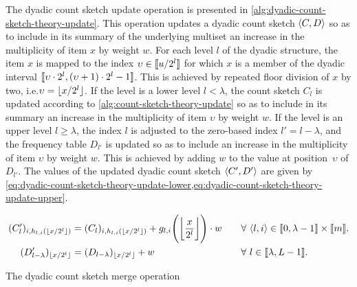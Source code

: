 The dyadic count sketch update operation is presented in \cref{alg:dyadic-count-sketch-theory-update}.
This operation updates a dyadic count sketch \( \langle C, D\rangle \) so as to include in its summary of the underlying multiset an increase in the multiplicity of item \( x \) by weight \( w \).
For each level \( l \) of the dyadic structure, the item \( x \) is mapped to the index \( \upsilon \in \llbracket u / 2^{l}\rrbracket \) for which \( x \) is a member of the dyadic interval \( \llbracket\upsilon \cdot 2^{l}, (\upsilon + 1) \cdot 2^{l} - 1\rrbracket \).
This is achieved by repeated floor division of \( x \) by two, i.e.\@ \( \upsilon = \lfloor x / 2^{l}\rfloor \).
If the level is a lower level \( l < \lambda \), the count sketch \( C_{l} \) is updated according to \cref{alg:count-sketch-theory-update} so as to include in its summary an increase in the multiplicity of item \( \upsilon \) by weight \( w \).
If the level is an upper level \( l \geq \lambda \), the index \( l \) is adjusted to the zero-based index \( l' = l - \lambda \), and the frequency table \( D_{l'} \) is updated so as to include an increase in the multiplicity of item \( \upsilon \) by weight \( w \).
This is achieved by adding \( w \) to the value at position~\( \upsilon \) of \( D_{l'} \).
The values of the updated dyadic count sketch \( \langle C', D'\rangle \) are given by \cref{eq:dyadic-count-sketch-theory-update-lower,eq:dyadic-count-sketch-theory-update-upper}.

\begin{alignat}{2}
  \label{eq:dyadic-count-sketch-theory-update-lower}
  (C'_{l})_{i, h_{l, i} (\floor{x / 2^{l}})} &= (C_{l})_{i, h_{l, i} (\floor{x / 2^{l}})} + g_{l, i} \Biggl( \floor[\bigg]{\frac{x}{2^{l}}} \Biggr) \cdot w & \quad &\forall\ \datasequence{l, i} \in \dataintegerinterval{0, \lambda - 1} \times \dataintegerinterval{m}. \\
  \label{eq:dyadic-count-sketch-theory-update-upper}
  (D'_{l - \lambda})_{\floor{x / 2^{l}}} &= (D_{l - \lambda})_{\floor{x / 2^{l}}} + w & \quad &\forall\ l \in \dataintegerinterval{\lambda, L - 1}.
\end{alignat}

\begin{algorithm}
  \caption{The dyadic count sketch merge operation}
  \label{alg:dyadic-count-sketch-theory-merge}
  
\end{algorithm}

